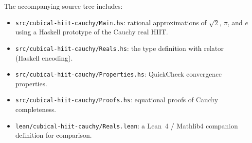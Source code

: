 \documentclass[12pt]{article}
\theoremstyle{definition}
\theoremstyle{remark}
\begin{document}
The accompanying source tree includes:
\begin{itemize}
\item \verb|src/cubical-hiit-cauchy/Main.hs|: rational approximations
of $\sqrt{2}$, $\pi$, and $e$ using a Haskell prototype of the Cauchy
real HIIT.
\item \verb|src/cubical-hiit-cauchy/Reals.hs|: the type definition with
relator (Haskell encoding).
\item \verb|src/cubical-hiit-cauchy/Properties.hs|: QuickCheck
convergence properties.
\item \verb|src/cubical-hiit-cauchy/Proofs.hs|: equational proofs of
Cauchy completeness.
\item \verb|lean/cubical-hiit-cauchy/Reals.lean|: a Lean~4 / Mathlib4
companion definition for comparison.
\end{itemize}
\end{document}
